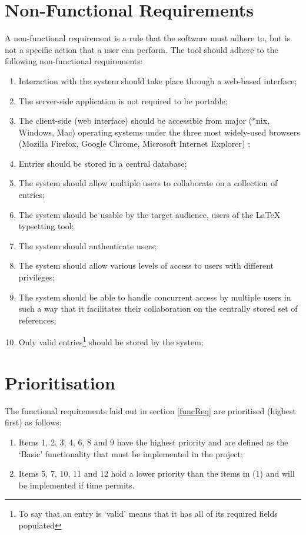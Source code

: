 \section{Non-Functional Requirements}
\label{nfReq}
A non-functional requirement is a rule that the software must adhere to, but is not a specific action that a user can perform.  The tool should adhere to the following non-functional requirements:
\begin{enumerate}
\item Interaction with the system should take place through a web-based interface;
\item The server-side application is not required to be portable;
\item The client-side (web interface) should be accessible from major (*nix, Windows, Mac) operating systems under the three most widely-used browsers (Mozilla Firefox, Google Chrome, Microsoft Internet Explorer) \cite{w3cBrowserStats};
\item Entries should be stored in a central database;
\item The system should allow multiple users to collaborate on a collection of \bibtex{} entries;
\item The system should be usable by the target audience, users of the \LaTeX{} typsetting tool;
\item The system should authenticate users;
\item The system should allow various levels of access to users with different
privileges;
\item The system should be able to handle concurrent access by multiple users in such a way that it facilitates their collaboration on the centrally stored set of references;
\item Only valid entries\footnote{To say that an entry is `valid' means that it has all of its required fields populated} should be stored by the system;
\end{enumerate}

\section{Prioritisation}
The functional requirements laid out in section \ref{funcReq} are prioritised (highest first) as follows:
\begin{enumerate}
	\item Items 1, 2, 3, 4, 6, 8 and 9 have the highest priority and are defined as the `Basic' functionality that must be implemented in the project;
	\item Items 5, 7, 10, 11 and 12 hold a lower priority than the items in (1) and will be implemented if time permits.
\end{enumerate}

